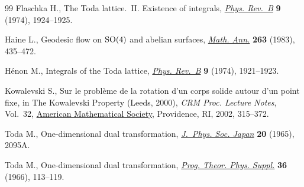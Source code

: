 \documentclass[pdftex]{sigma}
\numberwithin{equation}{section}
\begin{document}
\begin{thebibliography}{99}
Flaschka H., The {T}oda lattice.~{II}. {E}xistence of integrals, \href{https://doi.org/10.1103/PhysRevB.9.1924}{\textit{Phys.
 Rev.~B}} \textbf{9} (1974), 1924--1925.

Haine L., Geodesic flow on {${\rm SO}(4)$} and abelian surfaces, \href{https://doi.org/10.1007/BF01457053}{\textit{Math.
 Ann.}} \textbf{263} (1983), 435--472.

H\'enon M., Integrals of the {T}oda lattice, \href{https://doi.org/10.1103/PhysRevB.9.1921}{\textit{Phys. Rev.~B}} \textbf{9}
 (1974), 1921--1923.

Kowalevski S., Sur le probl\`eme de la rotation d'un corps solide autour d'un
 point fixe, in The {K}owalevski {P}roperty ({L}eeds, 2000), \textit{CRM Proc.
 Lecture Notes}, Vol.~32, \href{https://doi.org/10.1090/crmp/032/18}{American Mathematical Society}, Providence, RI, 2002,
 315--372.

Toda M., One-dimensional dual transformation, \href{https://doi.org/10.1143/JPSJ.20.2095A}{\textit{J.~Phys. Soc. Japan}}
 \textbf{20} (1965), 2095A.

Toda M., One-dimensional dual transformation, \href{https://doi.org/10.1143/PTPS.36.113}{\textit{Prog. Theor. Phys.
 Suppl.}} \textbf{36} (1966), 113--119.

\end{thebibliography}\LastPageEnding
\end{document}
